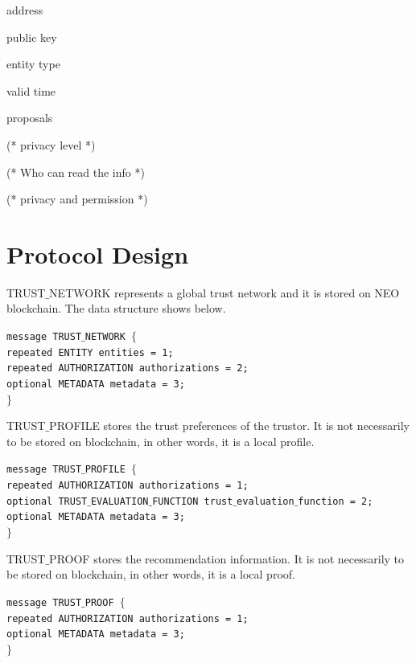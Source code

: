 \documentclass{article}
\begin{document}
address

public key

entity type

valid time

proposals

(* privacy level *)

(* Who can read the info *)

(* privacy and permission *)


\section{Protocol Design}

TRUST$\_$NETWORK represents a global trust network and it is stored on NEO blockchain. The data structure shows below.


\noindent \texttt{message TRUST$\_$NETWORK $\{$\\
\hspace*{2.ex} repeated ENTITY entities = 1;\\
\hspace*{2.ex} repeated AUTHORIZATION authorizations = 2;\\
\hspace*{2.ex} optional METADATA metadata = 3;\\
$\}$}

TRUST$\_$PROFILE stores the trust preferences of the trustor. It is not necessarily to be stored on blockchain, in other words, it is a local profile.


\noindent \texttt{message TRUST$\_$PROFILE $\{$\\
\hspace*{2.ex} repeated AUTHORIZATION authorizations = 1;\\
\hspace*{2.ex} optional TRUST$\_$EVALUATION$\_$FUNCTION trust$\_$evaluation$\_$function = 2;\\
\hspace*{2.ex} optional METADATA metadata = 3;\\
$\}$}

TRUST$\_$PROOF stores the recommendation information. It is not necessarily to be stored on blockchain, in other words, it is a local proof.


\noindent \texttt{message TRUST$\_$PROOF $\{$\\
\hspace*{2.ex} repeated AUTHORIZATION authorizations = 1;\\
\hspace*{2.ex} optional METADATA metadata = 3;\\
$\}$}
\end{document}
